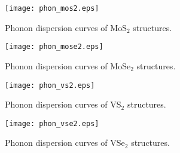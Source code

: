 \documentclass[a4paperm]{article}
\begin{document}
\begin{figure}[H]
	\texttt{[image: phon\_mos2.eps]}
	\caption{Phonon dispersion curves of MoS$_2$ structures. }
	\label{phon_mos2}
\end{figure}

\begin{figure}[H]
	\texttt{[image: phon\_mose2.eps]}
	\caption{Phonon dispersion curves of MoSe$_2$ structures. }
	\label{phon_mose2}
\end{figure}

\begin{figure}[H]
	\texttt{[image: phon\_vs2.eps]}
	\caption{Phonon dispersion curves of VS$_2$ structures. }
	\label{phon_vs2}
\end{figure}

\begin{figure}[H]
	\texttt{[image: phon\_vse2.eps]}
	\caption{Phonon dispersion curves of VSe$_2$ structures. }
	\label{phon_vse2}
\end{figure}
\end{document}
